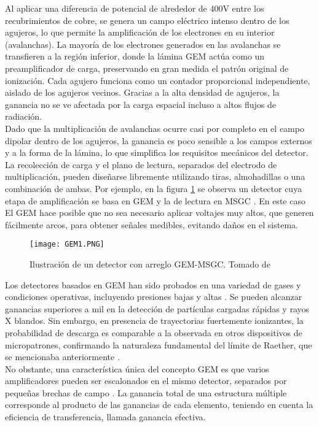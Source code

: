 \documentclass{report}
\begin{document}
\noindent Al aplicar una diferencia de potencial de alrededor de 400V entre los recubrimientos de cobre, se genera un campo eléctrico intenso dentro de los agujeros, lo que permite la amplificación de los electrones en su interior (avalanchas). La mayoría de los electrones generados en las avalanchas se transfieren a la región inferior, donde la lámina GEM actúa como un preamplificador de carga, preservando en gran medida el patrón original de ionización. Cada agujero funciona como un contador proporcional independiente, aislado de los agujeros vecinos. Gracias a la alta densidad de agujeros, la ganancia no se ve afectada por la carga espacial incluso a altos flujos de radiación.\\ 

\noindent Dado que la multiplicación de avalanchas ocurre casi por completo en el campo dipolar dentro de los agujeros, la ganancia es poco sensible a los campos externos y a la forma de la lámina, lo que simplifica los requisitos mecánicos del detector. La recolección de carga y el plano de lectura, separados del electrodo de multiplicación, pueden diseñarse libremente utilizando tiras, almohadillas o una combinación de ambas. Por ejemplo, en la figura \ref{fig:gem_MSGC} se observa un detector cuya etapa de amplificación se basa en GEM y la de lectura en MSGC \cite{zeuner2000msgc}. En este caso El GEM hace posible que no sea necesario aplicar voltajes muy altos, que generen fácilmente arcos, para obtener señales medibles, evitando daños en el sistema. 

\begin{figure}[H]
    \centering
    \texttt{[image: GEM1.PNG]}
    \caption{Ilustración de un detector con arreglo GEM-MSGC. Tomado de \cite{zeuner2000msgc}}
    \label{fig:gem_MSGC}
\end{figure}

\noindent Los detectores basados en GEM han sido probados en una variedad de gases y condiciones operativas, incluyendo presiones bajas y altas \cite{sauli2014gas}. Se pueden alcanzar ganancias superiores a mil en la detección de partículas cargadas rápidas y rayos X blandos. Sin embargo, en presencia de trayectorias fuertemente ionizantes, la probabilidad de descarga es comparable a la observada en otros dispositivos de micropatrones, confirmando la naturaleza fundamental del límite de Raether, que se mencionaba anteriormente \cite{bachmann1999charge}.\\

\noindent No obstante, una característica única del concepto GEM es que varios amplificadores pueden ser escalonados en el mismo detector, separados por pequeñas brechas de campo \cite{bouclier1997gas} \cite{benlloch1998further}. La ganancia total de una estructura múltiple corresponde al producto de las ganancias de cada elemento, teniendo en cuenta la eficiencia de transferencia, llamada ganancia efectiva.\\
\end{document}
